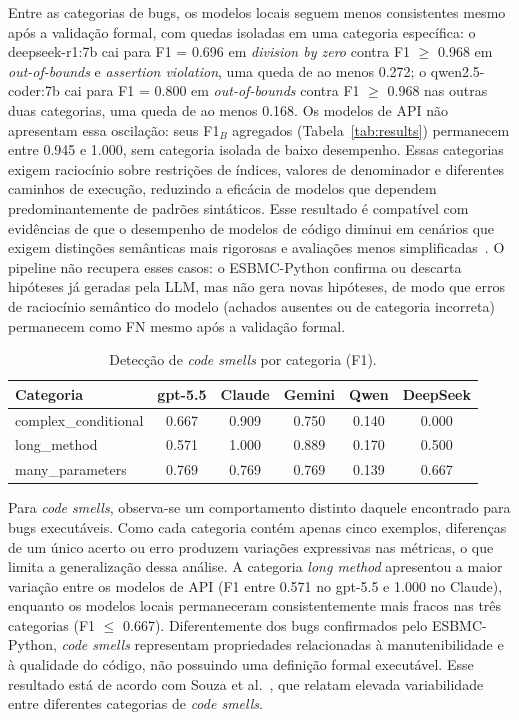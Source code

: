 \documentclass[sigconf]{acmart}
\begin{document}
Entre as categorias de bugs, os modelos locais seguem menos consistentes mesmo após a validação formal, com quedas isoladas em uma categoria específica: o deepseek-r1:7b cai para F1 = 0.696 em \textit{division by zero} contra F1 $\geq$ 0.968 em \textit{out-of-bounds} e \textit{assertion violation}, uma queda de ao menos 0.272; o qwen2.5-coder:7b cai para F1 = 0.800 em \textit{out-of-bounds} contra F1 $\geq$ 0.968 nas outras duas categorias, uma queda de ao menos 0.168. Os modelos de API não apresentam essa oscilação: seus F1$_B$ agregados (Tabela~\ref{tab:results}) permanecem entre 0.945 e 1.000, sem categoria isolada de baixo desempenho. Essas categorias exigem raciocínio sobre restrições de índices, valores de denominador e diferentes caminhos de execução, reduzindo a eficácia de modelos que dependem predominantemente de padrões sintáticos. Esse resultado é compatível com evidências de que o desempenho de modelos de código diminui em cenários que exigem distinções semânticas mais rigorosas e avaliações menos simplificadas~\cite{ding2025primevul}. O pipeline não recupera esses casos: o ESBMC-Python confirma ou descarta hipóteses já geradas pela LLM, mas não gera novas hipóteses, de modo que erros de raciocínio semântico do modelo (achados ausentes ou de categoria incorreta) permanecem como FN mesmo após a validação formal.



\begin{table}[h]
\caption{Detecção de \textit{code smells} por categoria (F1).}
\label{tab:smells}
\centering
\footnotesize
\begin{tabular}{lccccc}
\toprule
Categoria & gpt-5.5 & Claude & Gemini & Qwen & DeepSeek \\
\midrule
complex\_conditional & 0.667 & 0.909 & 0.750 & 0.140 & 0.000 \\
long\_method & 0.571 & 1.000 & 0.889 & 0.170 & 0.500 \\
many\_parameters & 0.769 & 0.769 & 0.769 & 0.139 & 0.667 \\
\bottomrule
\end{tabular}
\end{table}

Para \textit{code smells}, observa-se um comportamento distinto daquele
encontrado para bugs executáveis. Como cada categoria contém apenas cinco
exemplos, diferenças de um único acerto ou erro produzem variações
expressivas nas métricas, o que limita a generalização dessa análise. A
categoria \textit{long method} apresentou a maior variação entre os modelos
de API (F1 entre 0.571 no gpt-5.5 e 1.000 no Claude), enquanto os modelos
locais permaneceram consistentemente mais fracos nas três categorias
(F1 $\leq$ 0.667). Diferentemente dos bugs confirmados pelo ESBMC-Python,
\textit{code smells} representam propriedades relacionadas à
manutenibilidade e à qualidade do código, não possuindo uma definição formal
executável. Esse resultado está de acordo com Souza et
al.~\cite{souza2026beyondstrictrules}, que relatam elevada variabilidade
entre diferentes categorias de \textit{code smells}.
\end{document}
